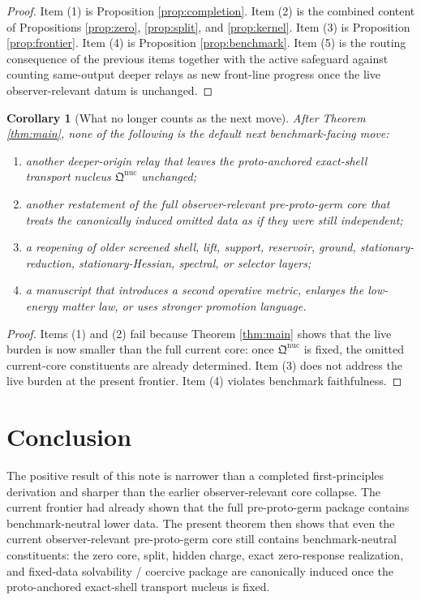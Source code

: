 \documentclass[11pt]{article}
\newcommand{\PreProtoNucleus}{\mathfrak Q^{\mathrm{nuc}}}
\newtheorem{corollary}{Corollary}
\begin{document}
\begin{proof}
Item (1) is Proposition \ref{prop:completion}. Item (2) is the combined content of Propositions \ref{prop:zero}, \ref{prop:split}, and \ref{prop:kernel}. Item (3) is Proposition \ref{prop:frontier}. Item (4) is Proposition \ref{prop:benchmark}. Item (5) is the routing consequence of the previous items together with the active safeguard against counting same-output deeper relays as new front-line progress once the live observer-relevant datum is unchanged.
\end{proof}

\begin{corollary}[What no longer counts as the next move]
\label{cor:screened}
After Theorem \ref{thm:main}, none of the following is the default next benchmark-facing move:
\begin{enumerate}
    \item another deeper-origin relay that leaves the proto-anchored exact-shell transport nucleus \(\PreProtoNucleus\) unchanged;
    \item another restatement of the full observer-relevant pre-proto-germ core that treats the canonically induced omitted data as if they were still independent;
    \item a reopening of older screened shell, lift, support, reservoir, ground, stationary-reduction, stationary-Hessian, spectral, or selector layers;
    \item a manuscript that introduces a second operative metric, enlarges the low-energy matter law, or uses stronger promotion language.
\end{enumerate}
\end{corollary}

\begin{proof}
Items (1) and (2) fail because Theorem \ref{thm:main} shows that the live burden is now smaller than the full current core: once \(\PreProtoNucleus\) is fixed, the omitted current-core constituents are already determined. Item (3) does not address the live burden at the present frontier. Item (4) violates benchmark faithfulness.
\end{proof}

\section{Conclusion}

The positive result of this note is narrower than a completed first-principles derivation and sharper than the earlier observer-relevant core collapse. The current frontier had already shown that the full pre-proto-germ package contains benchmark-neutral lower data. The present theorem then shows that even the current observer-relevant pre-proto-germ core still contains benchmark-neutral constituents: the zero core, split, hidden charge, exact zero-response realization, and fixed-data solvability / coercive package are canonically induced once the proto-anchored exact-shell transport nucleus is fixed.
\end{document}
